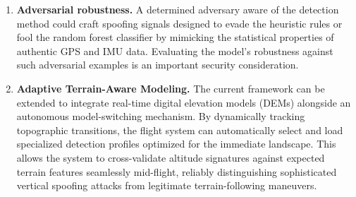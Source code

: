 \documentclass[electronics,article,accept,moreauthors]{Definitions/mdpi}
\begin{document}
\begin{enumerate}
\item \textbf{Adversarial robustness.} A determined adversary aware of the detection method could craft spoofing signals designed to evade the heuristic rules or fool the random forest classifier by mimicking the statistical properties of authentic GPS and IMU data. Evaluating the model's robustness against such adversarial examples is an important security consideration.
\item \textbf{Adaptive Terrain-Aware Modeling.} The current framework can be extended to integrate real-time digital elevation models (DEMs) alongside an autonomous model-switching mechanism. By dynamically tracking topographic transitions, the flight system can automatically select and load specialized detection profiles optimized for the immediate landscape. This allows the system to cross-validate altitude signatures against expected terrain features seamlessly mid-flight, reliably distinguishing sophisticated vertical spoofing attacks from legitimate terrain-following maneuvers.
\end{enumerate}


\vspace{6pt}








\end{document}
